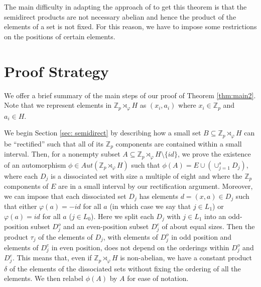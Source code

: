 \documentclass[11pt]{amsart}
\theoremstyle{definition}
\begin{document}
The main difficulty in adapting the approach of \cite{BK} to get this theorem is that the semidirect products are not necessary abelian and hence the product of the elements of a set is not fixed. For this reason, we have to impose some restrictions on the positions of certain elements.

\section{Proof Strategy}\label{sec:proof-strat}

We offer a brief summary of the main steps of our proof of Theorem \ref{thm:main2}. Note that we represent elements in $\mathbb{Z}_{p} \rtimes_{\varphi} H$ as $(x_i, a_i)$ where $x_i \in \mathbb{Z}_p$ and $a_i \in H$. 

We begin Section \ref{sec: semidirect} by describing how a small set $B \subseteq \mathbb{Z}_{p} \rtimes_{\varphi} H$ can be ``rectified'' such that all of its $\mathbb{Z}_p$ components are contained within a small interval. Then, for a nonempty subset $A \subseteq \mathbb{Z}_{p} \rtimes_{\varphi} H\setminus\{id\}$, we prove the existence of an automorphism $\phi \in Aut(\mathbb{Z}_{p} \rtimes_{\varphi} H)$ such that $\phi(A) = E \cup\left(\cup_{j=1}^{s} D_j\right)$, where each $D_j$ is a dissociated set with size a multiple of eight and where the $\mathbb{Z}_p$ components of $E$ are in a small interval by our rectification argument. Moreover, we can impose that each dissociated set $D_j$ has elements $d = (x, a) \in D_j$ such that either $\varphi(a) = -id$ for all $a$ (in which case we say that $j\in L_1$) or $\varphi(a) = id$ for all $a$ ($j\in L_0$). Here we split each $D_j$ with $j\in L_1$ into an odd-position subset $D^o_j$ and an even-position subset $D^e_j$ of about equal sizes. Then the product $\tau_j$ of the elements of $D_j$, with elements of $D^o_j$ in odd position and elements of $D^e_j$ in even position, does not depend on the orderings within $D_j^o$ and $D_j^e$. This means that, even if $\mathbb{Z}_{p} \rtimes_{\varphi} H$ is non-abelian, we have a constant product $\delta$ of the elements of the dissociated sets without fixing the ordering of all the elements.
We then relabel $\phi(A)$ by $A$ for ease of notation. 
\end{document}
